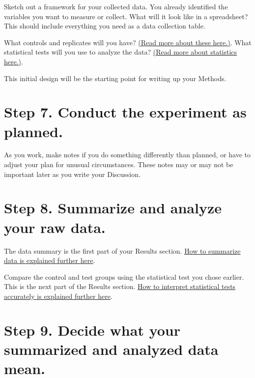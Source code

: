 \documentclass[
]{book}
\begin{document}
Sketch out a framework for your collected data. You already identified the variables you want to measure or collect. What will it look like in a spreadsheet? This should include everything you need as a data collection table.

What controls and replicates will you have? \protect\hyperlink{replicates220}{(Read more about these here.)}. What statistical tests will you use to analyze the data? \protect\hyperlink{biostats450}{(Read more about statistics here.)}.

This initial design will be the starting point for writing up your Methods.

\hypertarget{step-7.-conduct-the-experiment-as-planned.}{%
\section*{Step 7. Conduct the experiment as planned.}\label{step-7.-conduct-the-experiment-as-planned.}}

As you work, make notes if you do something differently than planned, or have to adjust your plan for unusual circumstances. These notes may or may not be important later as you write your Discussion.

\hypertarget{step-8.-summarize-and-analyze-your-raw-data.}{%
\section*{Step 8. Summarize and analyze your raw data.}\label{step-8.-summarize-and-analyze-your-raw-data.}}

The data summary is the first part of your Results section. \protect\hyperlink{sumstats460}{How to summarize data is explained further here}.

Compare the control and test groups using the statistical test you chose earlier. This is the next part of the Results section. \protect\hyperlink{compstatsone470}{How to interpret statistical tests accurately is explained further here}.

\hypertarget{step-9.-decide-what-your-summarized-and-analyzed-data-mean.}{%
\section*{Step 9. Decide what your summarized and analyzed data mean.}\label{step-9.-decide-what-your-summarized-and-analyzed-data-mean.}}
\end{document}
